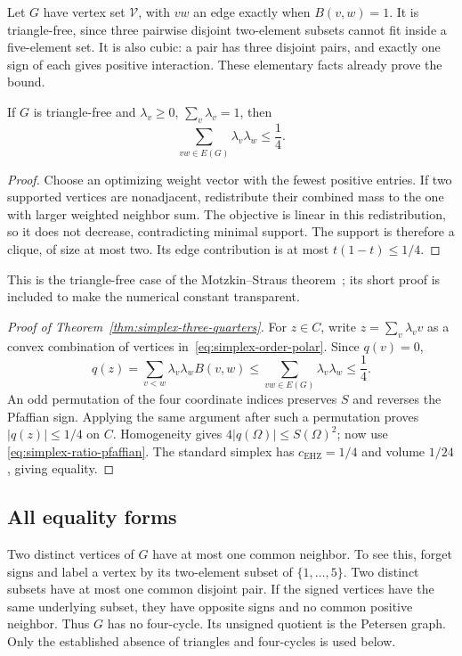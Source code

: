 Let $G$ have vertex set $\mathcal V$, with $vw$ an edge exactly when
$B(v,w)=1$. It is triangle-free, since three pairwise disjoint two-element
subsets cannot fit inside a five-element set. It is also cubic: a pair has
three disjoint pairs, and exactly one sign of each gives positive
interaction. These elementary facts already prove the bound.

\begin{lemma}\label{lem:simplex-graph-bound}
If $G$ is triangle-free and $\lambda_v\ge0$, $\sum_v\lambda_v=1$, then
\[
 \sum_{vw\in E(G)}\lambda_v\lambda_w\le\frac14.
\]
\end{lemma}
\begin{proof}
Choose an optimizing weight vector with the fewest positive entries. If
two supported vertices are nonadjacent, redistribute their combined mass
to the one with larger weighted neighbor sum. The objective is linear in
this redistribution, so it does not decrease, contradicting minimal
support. The support is therefore a clique, of size at most two. Its
edge contribution is at most $t(1-t)\le1/4$.
\end{proof}
This is the triangle-free case of the Motzkin--Straus
theorem~\cite[Theorem~1]{MotzkinStraus1965}; its short
proof is included to make the numerical constant transparent.

\begin{proof}[Proof of Theorem~\ref{thm:simplex-three-quarters}]
For $z\in C$, write $z=\sum_v\lambda_vv$ as a convex combination of
vertices in~\eqref{eq:simplex-order-polar}. Since $q(v)=0$,
\[
 q(z)=\sum_{v<w}\lambda_v\lambda_wB(v,w)
 \le\sum_{vw\in E(G)}\lambda_v\lambda_w\le\frac14.
\]
An odd permutation of the four coordinate indices preserves $S$ and
reverses the Pfaffian sign. Applying the same argument after such a
permutation proves $|q(z)|\le1/4$ on $C$. Homogeneity gives
$4|q(\Omega)|\le S(\Omega)^2$; now use
\eqref{eq:simplex-ratio-pfaffian}. The standard simplex has
$c_{\mathrm{EHZ}}=1/4$ and volume $1/24$, giving equality.
\end{proof}

\subsection{All equality forms}

Two distinct vertices of $G$ have at most one common neighbor. To see this,
forget signs and label a vertex by its two-element subset of
$\{1,\ldots,5\}$. Two distinct subsets have at most one common disjoint
pair. If the signed vertices have the same underlying subset, they have
opposite signs and no common positive neighbor. Thus $G$ has no
four-cycle. Its unsigned quotient is the Petersen graph. Only the
established absence of triangles and four-cycles is used below.

